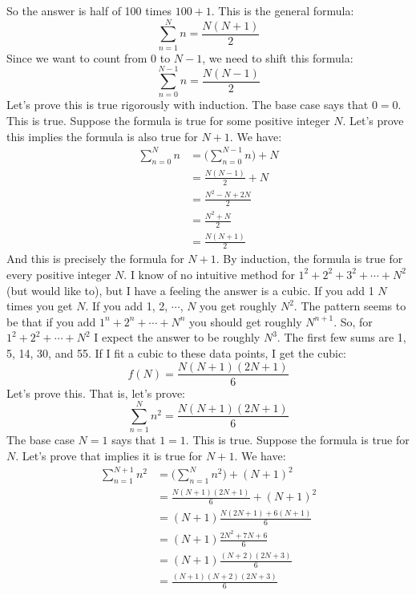 \documentclass{article}
\theoremstyle{normal}
\theoremstyle{plain}
\begin{document}
    So the answer is half of 100 times $100+1$. This is the general formula:
    \begin{equation}
        \sum_{n=1}^{N}n=\frac{N(N+1)}{2}
    \end{equation}
    Since we want to count from 0 to $N-1$, we need to shift this formula:
    \begin{equation}
        \sum_{n=0}^{N-1}n=\frac{N(N-1)}{2}
    \end{equation}
    Let's prove this is true rigorously with induction. The base case says that
    $0=0$. This is true. Suppose the formula is true for some positive integer
    $N$. Let's prove this implies the formula is also true for $N+1$. We have:
    \begin{align}
        \sum_{n=0}^{N}n
            &=\Big(\sum_{n=0}^{N-1}n\Big)+N\tag{Definition of $\Sigma$}\\
            &=\frac{N(N-1)}{2}+N\tag{Inductive Hypothesis}\\
            &=\frac{N^{2}-N+2N}{2}\tag{Factoring and Common Denominators}\\
            &=\frac{N^{2}+N}{2}\tag{Simplify}\\
            &=\frac{N(N+1)}{2}\tag{Factor}
    \end{align}
    And this is precisely the formula for $N+1$. By induction, the formula
    is true for every positive integer $N$.
    \newpage
    I know of no intuitive method for $1^{2}+2^{2}+3^{2}+\cdots+N^{2}$
    (but would like to), but I have a feeling the answer is a cubic. If you
    add 1 $N$ times you get $N$. If you add 1, 2, $\cdots$, $N$ you get
    roughly $N^{2}$. The pattern seems to be that if you add
    $1^{n}+2^{n}+\cdots+N^{n}$ you should get roughly $N^{n+1}$. So, for
    $1^{2}+2^{2}+\cdots+N^{2}$ I expect the answer to be roughly $N^{3}$.
    The first few sums are 1, 5, 14, 30, and 55. If I fit a cubic to these
    data points, I get the cubic:
    \begin{equation}
        f(N)=\frac{N(N+1)(2N+1)}{6}
    \end{equation}
    Let's prove this. That is, let's prove:
    \begin{equation}
        \sum_{n=1}^{N}n^{2}=\frac{N(N+1)(2N+1)}{6}
    \end{equation}
    The base case $N=1$ says that $1=1$. This is true. Suppose the formula is
    true for $N$. Let's prove that implies it is true for $N+1$. We have:
    \begin{align}
        \sum_{n=1}^{N+1}n^{2}
            &=\Big(\sum_{n=1}^{N}n^{2}\Big)+(N+1)^{2}\\
            &=\frac{N(N+1)(2N+1)}{6}+(N+1)^{2}\\
            &=(N+1)\frac{N(2N+1)+6(N+1)}{6}\\
            &=(N+1)\frac{2N^{2}+7N+6}{6}\\
            &=(N+1)\frac{(N+2)(2N+3)}{6}\\
            &=\frac{(N+1)(N+2)(2N+3)}{6}
    \end{align}
\end{document}
